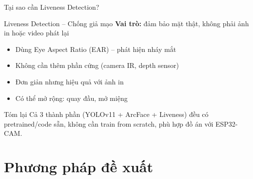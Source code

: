 \documentclass[aspectratio=169]{beamer}
\begin{document}
\begin{frame}{Tại sao cần Liveness Detection?}
  \begin{block}{Liveness Detection -- Chống giả mạo}
    \textbf{Vai trò:} đảm bảo mặt thật, không phải ảnh in hoặc video phát lại
  \end{block}

  \vspace{0.5em}
  \begin{itemize}
    \item Dùng Eye Aspect Ratio (EAR) -- phát hiện nháy mắt
    \item Không cần thêm phần cứng (camera IR, depth sensor)
    \item Đơn giản nhưng hiệu quả với ảnh in
    \item Có thể mở rộng: quay đầu, mở miệng
  \end{itemize}

  \vspace{0.5em}
  \begin{alertblock}{Tóm lại}
    Cả 3 thành phần (YOLOv11 + ArcFace + Liveness) đều có pretrained/code sẵn, không cần train from scratch, phù hợp đồ án với ESP32-CAM.
  \end{alertblock}
\end{frame}

\section{Phương pháp đề xuất}
\end{document}
